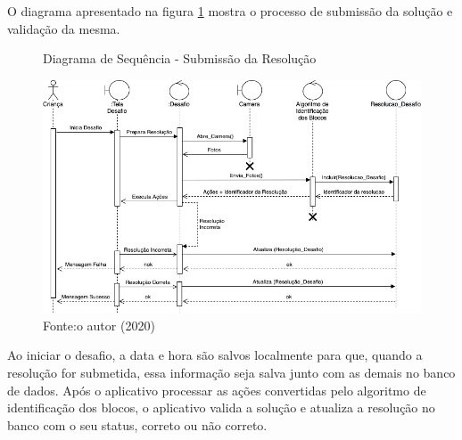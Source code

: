         
        O diagrama apresentado na figura \ref{figura:sequencia_jogo} mostra o processo de submissão da solução e validação da mesma.
        
        \begin{figure}[h!]
            \centering
            \caption{Diagrama de Sequência - Submissão da Resolução}
            \includegraphics[width=14cm]{images/cap3/Sequencia_Jogo.jpg}
            \caption*{Fonte:o autor (2020)}
            \label{figura:sequencia_jogo}
        \end{figure}
        
        Ao iniciar o desafio, a data e hora são salvos localmente para que, quando a resolução for submetida, essa informação seja salva junto com as demais no banco de dados.
        Após o aplicativo processar as ações convertidas pelo algoritmo de identificação dos blocos, o aplicativo valida a solução e atualiza a resolução no banco com o seu status, correto ou não correto.
        
        
   